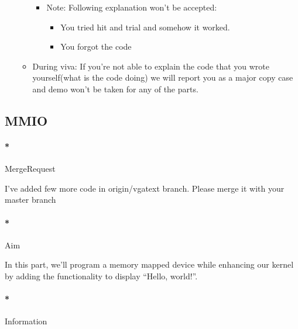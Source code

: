 \documentclass[]{article}
\newenvironment{Shaded}{}{}
\newcommand{\ExtensionTok}[1]{{#1}}
\newcommand{\NormalTok}[1]{{#1}}
\providecommand{\tightlist}{%
  \setlength{\itemsep}{0pt}\setlength{\parskip}{0pt}}
\let\oldparagraph\paragraph
\renewcommand{\paragraph}[1]{\oldparagraph{#1}\mbox{}}
\begin{document}
\begin{itemize}
\begin{itemize}
    \begin{itemize}
    \tightlist
    \item
      Note: Following explanation won't be accepted:

      \begin{itemize}
      \tightlist
      \item
        You tried hit and trial and somehow it worked.
      \item
        You forgot the code
      \end{itemize}
    \end{itemize}
  \item
    During viva: If you're not able to explain the code that you wrote
    yourself(what is the code doing) we will report you as a major copy
    case and demo won't be taken for any of the parts.
  \end{itemize}
\end{itemize}

\subsection{MMIO}\label{mmio}

\paragraph*{MergeRequest}\label{mergerequest}

I've added few more code in origin/vgatext branch. Please merge it with
your master branch

\begin{Shaded}
\end{Shaded}

\paragraph*{Aim}\label{aim}

In this part, we'll program a memory mapped device while enhancing our
kernel by adding the functionality to display ``Hello, world!''.

\paragraph*{Information}\label{information}
\end{document}
